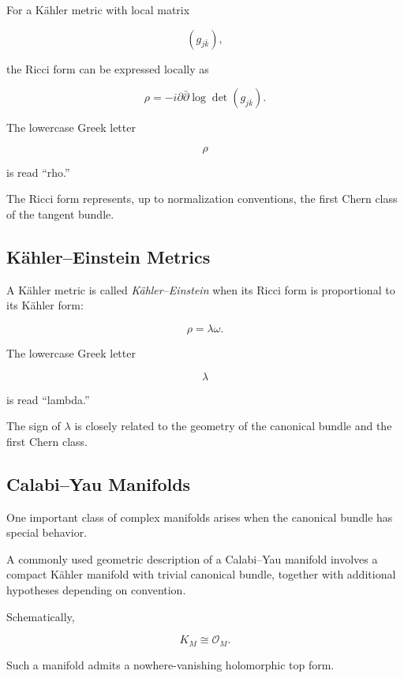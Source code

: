 For a K\"ahler metric with local matrix

\[
(g_{j\bar k}),
\]

the Ricci form can be expressed locally as

\[
\boxed{
\rho
=
-i\partial\bar{\partial}
\log\det(g_{j\bar k}).
}
\]

The lowercase Greek letter

\[
\rho
\]

is read ``rho.''

The Ricci form represents, up to normalization conventions, the first Chern
class of the tangent bundle.

\subsection{K\"ahler--Einstein Metrics}
\label{subsec:kahler-einstein}

A K\"ahler metric is called \emph{K\"ahler--Einstein} when its Ricci form is
proportional to its K\"ahler form:

\[
\boxed{
\rho=\lambda\omega.
}
\]

The lowercase Greek letter

\[
\lambda
\]

is read ``lambda.''

The sign of \(\lambda\) is closely related to the geometry of the canonical
bundle and the first Chern class.

\subsection{Calabi--Yau Manifolds}
\label{subsec:calabi-yau-manifolds}

One important class of complex manifolds arises when the canonical bundle
has special behavior.

A commonly used geometric description of a Calabi--Yau manifold involves a
compact K\"ahler manifold with trivial canonical bundle, together with
additional hypotheses depending on convention.

Schematically,

\[
\boxed{
K_M\cong\mathcal{O}_M.
}
\]

Such a manifold admits a nowhere-vanishing holomorphic top form.

